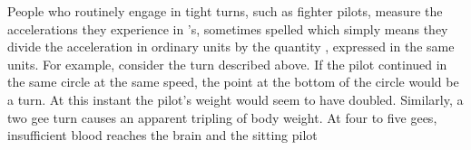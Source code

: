 {
People who routinely engage in tight turns, such as fighter pilots, measure
the accelerations they experience in 's, sometimes spelled 
which simply means they divide the acceleration in ordinary units by the
quantity , expressed in the same units.
For example, consider the  turn described above.
If the pilot continued in the same circle at the same speed, the point at
the bottom of the circle would be a  turn. 
At this instant the pilot's weight would seem to have doubled.
Similarly, a two gee turn causes an apparent tripling of body weight.
At four to five gees, insufficient blood reaches the brain and the sitting
pilot 
%
}%
%

